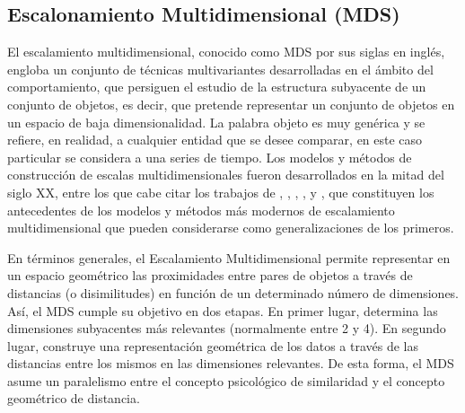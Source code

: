 \documentclass[12pt,oneside]{book}\usepackage[]{graphicx}\usepackage[]{color}
\theoremstyle{definition} %
\begin{document}

\subsection{Escalonamiento Multidimensional (MDS)}


El escalamiento multidimensional, conocido como MDS por sus siglas en inglés, engloba un conjunto de técnicas multivariantes desarrolladas en el ámbito del comportamiento, que persiguen el estudio de la estructura subyacente de un conjunto de objetos, es decir, que pretende representar un conjunto de objetos en un espacio de baja dimensionalidad. La palabra objeto es muy genérica y se refiere, en realidad, a cualquier entidad que se desee comparar, en este caso particular se considera a una series de tiempo. Los modelos y métodos de construcción de escalas multidimensionales fueron desarrollados en la mitad del siglo XX, entre los que cabe citar los trabajos de \citeauthor{stevens1946theory} \citeyear{stevens1946theory}, \citeauthor{coombs1950psychological} \citeyear{coombs1950psychological}, \citeauthor{torgerson1958theory} \citeyear{torgerson1958theory}, \citeauthor{kruskal1964multidimensional} \citeyear{kruskal1964multidimensional}, y \citeauthor{guttman1968general} \citeyear{guttman1968general}, que constituyen los antecedentes de los modelos y métodos más modernos de escalamiento multidimensional que pueden considerarse como generalizaciones de los primeros.




En términos generales, el Escalamiento Multidimensional permite representar en un espacio geométrico las proximidades entre pares de objetos a través de distancias (o disimilitudes) en función de un determinado número de dimensiones. Así, el MDS cumple su objetivo en dos etapas. En primer lugar, determina las dimensiones subyacentes más relevantes (normalmente entre 2 y 4). En segundo lugar, construye una representación geométrica de los datos a través de las distancias entre los mismos en las dimensiones relevantes.  De esta forma, el MDS asume un paralelismo entre el concepto psicológico de similaridad y el concepto geométrico de distancia.


\end{document}
